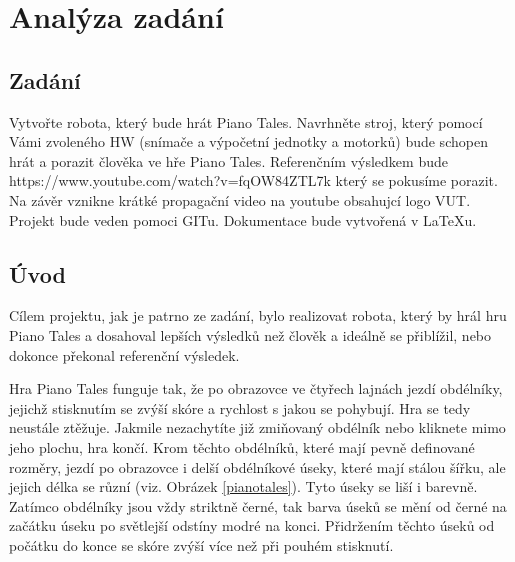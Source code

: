 \documentclass[12pt,oneside]{book} %
\begin{document}
	


\tableofcontents

\chapter{Analýza zadání}\label{analyza-zadani}
\section{Zadání}
\qquad Vytvořte robota, který bude hrát Piano Tales. Navrhněte stroj, který pomocí Vámi zvoleného HW (snímače a výpočetní jednotky a motorků) bude schopen hrát a porazit člověka ve hře Piano Tales. Referenčním výsledkem bude https://www.youtube.com/watch?v=fqOW84ZTL7k který se pokusíme porazit. Na závěr vznikne krátké propagační video na youtube obsahujcí logo VUT.
Projekt bude veden pomoci GITu. Dokumentace bude vytvořená v LaTeXu. 
\section{Úvod}\label{uvod}
\qquad Cílem projektu, jak je patrno ze zadání, bylo realizovat robota, který by hrál hru Piano Tales a dosahoval lepších výsledků než člověk a ideálně se přiblížil, nebo dokonce překonal referenční výsledek.

\qquad Hra Piano Tales funguje tak, že po obrazovce ve čtyřech lajnách jezdí obdélníky, jejichž stisknutím se zvýší skóre a rychlost s jakou se pohybují. Hra se tedy neustále ztěžuje. Jakmile nezachytíte již zmiňovaný obdélník nebo kliknete mimo jeho plochu, hra končí. Krom těchto obdélníků, které mají pevně definované rozměry, jezdí po obrazovce i delší obdélníkové úseky, které mají stálou šířku, ale jejich délka se různí (viz. Obrázek \ref{pianotales}). Tyto úseky se liší i barevně. Zatímco obdélníky jsou vždy striktně černé, tak barva úseků se mění od černé na začátku úseku po světlejší odstíny modré na konci. Přidržením těchto úseků od počátku do konce se skóre zvýší více než při pouhém stisknutí. 
\end{document}
